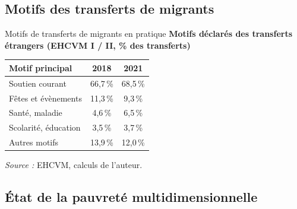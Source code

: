 \documentclass[10pt,aspectratio=169]{beamer}
\begin{document}
\subsection{Motifs des transferts de migrants}

\begin{frame}{Motifs de transferts de migrants en pratique}
	\footnotesize
	\centering
	{\footnotesize\color{presor}\textbf{Motifs déclarés des transferts étrangers
			(EHCVM I / II, \% des transferts)}}\smallskip
	\renewcommand{\arraystretch}{1.15}
	\setlength{\tabcolsep}{14pt}
	\begin{tabular}{@{}lcc@{}}
		\toprule
		\rowcolor{presvert!88!black}
		\color{white}Motif principal & \color{white}2018 & \color{white}2021 \\
		\midrule
		\rowcolor{presorange!16}
		Soutien courant            & 66,7\,\% & 68,5\,\% \\
		Fêtes et évènements        & 11,3\,\% & 9,3\,\% \\
		\rowcolor{presvert!7}
		Santé, maladie             & 4,6\,\%  & 6,5\,\% \\
		Scolarité, éducation       & 3,5\,\%  & 3,7\,\% \\
		\rowcolor{presvert!7}
		Autres motifs              & 13,9\,\% & 12,0\,\% \\
		\bottomrule
	\end{tabular}

  \par\smallskip
  {\scriptsize\color{presgris}\textit{Source :} EHCVM, calculs de l'auteur.}
\end{frame}

\subsection{État de la pauvreté multidimensionnelle}
\end{document}
